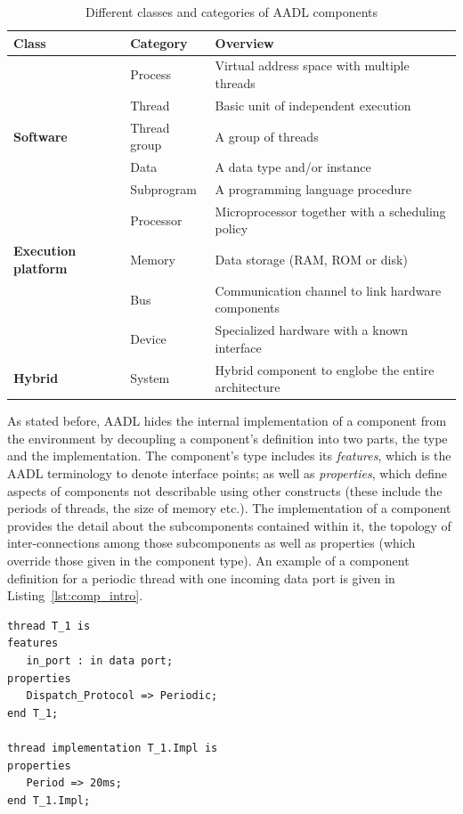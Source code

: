 \begin{table}
\centering
\begin{tabular}{|l|l|l|}
\hline
\textbf{Class} & \textbf{Category} & \textbf{Overview}\\
\hline
 & Process & Virtual address space with multiple threads\\
 & Thread & Basic unit of independent execution\\
\textbf{Software} & Thread group & A group of threads\\
 & Data & A data type and/or instance\\
 & Subprogram & A programming language procedure\\
\hline
 & Processor & Microprocessor together with a scheduling policy\\
\textbf{Execution platform} & Memory & Data storage (RAM, ROM or disk)\\
 & Bus & Communication channel to link hardware components\\
 & Device & Specialized hardware with a known interface\\
\hline
\textbf{Hybrid} & System & Hybrid component to englobe the entire
architecture\\
\hline
\end{tabular}
\caption{Different classes and categories of AADL components}
\label{tab:comp_cats}
\end{table}

As stated before, AADL hides the internal implementation of a
component from the environment by decoupling a component's definition
into two parts, the type and the implementation. The component's type
includes its \emph{features}, which is the AADL terminology to denote
interface points; as well as \emph{properties}, which define aspects
of components not describable using other constructs (these include
the periods of threads, the size of memory etc.). The implementation
of a component provides the detail about the subcomponents contained
within it, the topology of inter-connections among those subcomponents
as well as properties (which override those given in the component
type). An example of a component definition for a periodic thread with
one incoming data port is given in Listing~\ref{lst:comp_intro}.

\begin{minipage}{\listingwidth}
\lstset{language=ada,
  numbers=left,
  numberstyle=\tiny
}
\lstset{language=aadl}
\begin{lstlisting}[label=lst:comp_intro, caption=An AADL periodic
    thread with a period of 20 msec and one incoming data port]
thread T_1 is
features
   in_port : in data port;
properties
   Dispatch_Protocol => Periodic;
end T_1;

thread implementation T_1.Impl is
properties
   Period => 20ms;
end T_1.Impl;
\end{lstlisting}
\end{minipage}

